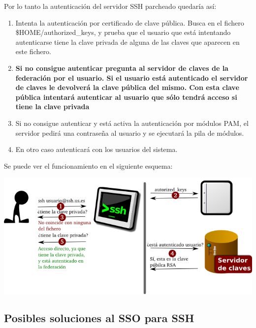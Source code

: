     Por lo tanto la autenticación del servidor SSH parcheado quedaría así:

    \begin{enumerate}

    \item Intenta la autenticación por certificado de clave pública. Busca
    en el fichero \$HOME/authorized\_keys, y prueba que el usuario que está
    intentando autenticarse tiene la clave privada de alguna de las claves
    que aparecen en este fichero.

    \item \textbf{Si no consigue autenticar pregunta al servidor de claves
    de la federación por el usuario. Si el usuario está autenticado el
    servidor de claves le devolverá la clave pública del mismo. Con esta
    clave pública intentará autenticar al usuario que sólo tendrá acceso
    si tiene la clave privada}

    \item Si no consigue autenticar y está activa la autenticación por
    módulos PAM, el servidor pedirá una contraseña al usuario y se
    ejecutará la pila de módulos.

    \item En otro caso autenticará con los usuarios del sistema.

    \end{enumerate}

    Se puede ver el funcionamiento en el siguiente esquema:

    \begin{center}
        \includegraphics[width=\textwidth]{img/funcionamientossh.png}
    \end{center}


        \subsection{Posibles soluciones al SSO para SSH}

